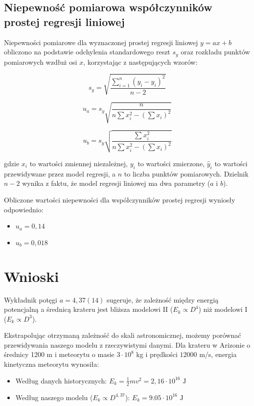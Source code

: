 \documentclass[a4paper,12pt]{article}
\begin{document}
\subsection{Niepewność pomiarowa współczynników prostej regresji liniowej}

Niepewności pomiarowe dla wyznaczonej prostej regresji liniowej $y = ax + b$ obliczono na podstawie odchylenia standardowego reszt $s_y$ oraz rozkładu punktów pomiarowych wzdłuż osi $x$, korzystając z następujących wzorów:

\[
    s_y = \sqrt{\frac{\sum_{i=1}^{n} (y_i - \hat{y}_i)^2}{n-2}}
\]

\[
    u_a = s_y \sqrt{\frac{n}{n \sum x_i^2 - \left( \sum x_i \right)^2}}
\]

\[
    u_b = s_y \sqrt{\frac{\sum x_i^2}{n \sum x_i^2 - \left( \sum x_i \right)^2}}
\]

gdzie $x_i$ to wartości zmiennej niezależnej, $y_i$ to wartości zmierzone, $\hat{y}_i$ to wartości przewidywane przez model regresji, a $n$ to liczba punktów pomiarowych. Dzielnik $n-2$ wynika z faktu, że model regresji liniowej ma dwa parametry ($a$ i $b$).


Obliczone wartości niepewności dla współczynników prostej regresji wyniosły odpowiednio:

\begin{itemize}
    \item $u_a = 0,14$
    \item $u_b = 0,018$
\end{itemize}

\newpage

\section{Wnioski}

Wykładnik potęgi $a = 4,37(14)$ sugeruje, że zależność między energią potencjalną a średnicą krateru jest bliższa modelowi II ($E_k \propto D^4$) niż modelowi I ($E_k \propto D^3$).

Ekstrapolując otrzymaną zależność do skali astronomicznej, możemy porównać przewidywania naszego modelu z rzeczywistymi danymi. Dla krateru w Arizonie o średnicy 1200 m i meteorytu o masie $3\cdot10^8$ kg i prędkości $12000$ m/s, energia kinetyczna meteorytu wynosiła:

\begin{itemize}
    \item Według danych historycznych: $E_k = \frac{1}{2}mv^2 = 2,16\cdot10^{16} \text{ J}$
    \item Według naszego modelu ($E_k \propto D^{4,37}$): $E_k = 9.05\cdot10^{16} \text{ J}$
\end{itemize}
\end{document}
